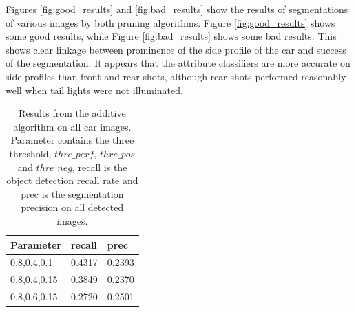 \documentclass[10pt,twocolumn,letterpaper]{article}
\begin{document}
Figures \ref{fig:good_results} and \ref{fig:bad_results} show the
results of segmentations of various images by both pruning
algorithms. Figure \ref{fig:good_results} shows some good results,
while Figure \ref{fig:bad_results} shows some bad results. This
shows clear linkage between prominence of the side profile of the
car and success of the segmentation. It appears that the attribute
classifiers are more accurate on side profiles than front and rear
shots, although rear shots performed reasonably well when tail
lights were not illuminated.

\begin{table}
\centering
\begin{tabular}{|l|l|l|}
\hline Parameter & recall & prec \\
\hline 0.8,0.4,0.1  & 0.4317 & 0.2393 \\
\hline 0.8,0.4,0.15  & 0.3849 & 0.2370 \\
\hline 0.8,0.6,0.15  & 0.2720 & 0.2501 \\
\hline
\end{tabular}
\caption{Results from the additive algorithm on all car images.
Parameter contains the three threshold, $thre\_perf$, $thre\_pos$
and $thre\_neg$, recall is the object detection recall rate and prec
is the segmentation precision on all detected images.}
\label{table:aresults}
\end{table}
\end{document}
